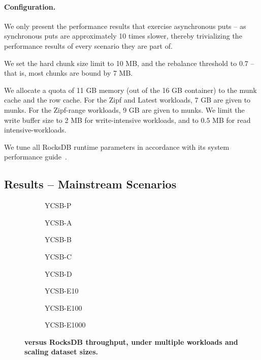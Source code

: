 \paragraph{Configuration.} 

We only present the performance results that exercise asynchronous puts -- as synchronous puts 
are approximately 10 times slower, thereby trivializing the performance results of every scenario 
they are part of. 

We set the \sys\/ hard chunk size limit to 10 MB, and the rebalance threshold to $0.7$ -- that is, 
most chunks are bound by 7 MB. 

We allocate a quota of 11 GB memory (out of the 16 GB container) to the munk cache and the row cache. 
For the Zipf and Latest workloads, 7 GB are given to munks. For the Zipf-range workloads, 9 GB 
are given to munks.  We limit the write buffer size to 2 MB for write-intensive workloads, and to $0.5$ MB 
for read intensive-workloads. 
  
We tune all RocksDB runtime parameters in accordance with its system performance guide~\cite{RocksDBPerf}.   

\subsection{Results -- Mainstream Scenarios}

\begin{figure*}[tb]
\centering
\begin{subfigure}{0.3\linewidth}
\caption{YCSB-P}
\label{fig:throughput:p}
\end{subfigure}
\hspace{0.2\linewidth}
\begin{subfigure}{0.3\linewidth}
\caption{YCSB-A}
\label{fig:throughput:a}
\end{subfigure}
\begin{subfigure}{0.3\linewidth}
\caption{YCSB-B}
\label{fig:throughput:b}
\end{subfigure}
\begin{subfigure}{0.3\linewidth}
\caption{YCSB-C}
\label{fig:throughput:c}
\end{subfigure}
\begin{subfigure}{0.3\linewidth}
\caption{YCSB-D}
\label{fig:throughput:d}
\end{subfigure}
\begin{subfigure}{0.3\linewidth}
\caption{YCSB-E10}
\label{fig:throughput:e10}
\end{subfigure}
\begin{subfigure}{0.3\linewidth}
\caption{YCSB-E100}
\label{fig:throughput:e100}
\end{subfigure}
\begin{subfigure}{0.3\linewidth}
\caption{YCSB-E1000}
\label{fig:throughput:e1000}
\end{subfigure}
\caption{\bf{\sys\/ versus RocksDB throughput, under multiple workloads and scaling dataset sizes.}}
\label{fig:throughput}
\end{figure*}

